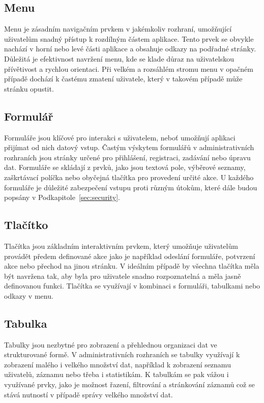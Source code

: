 \subsection*{Menu}
\label{subsec:admin-tags-menu}
Menu je zásadním navigačním prvkem v jakémkoliv rozhraní, umožňující uživatelům snadný přístup k rozdílným částem aplikace. Tento prvek se obvykle nachází v horní nebo levé části aplikace a obsahuje odkazy na podřadné stránky. Důležitá je efektivnost navržení menu, kde se klade důraz na uživatelskou přívětivost a rychlou orientaci. Při velkém a rozsáhlém stromu menu v opačném případě dochází k častému zmatení uživatele, který v takovém případě může stránku opustit.

\subsection*{Formulář}
\label{subsec:admin-tags-form}
Formuláře jsou klíčové pro interakci s uživatelem, neboť umožňují aplikaci přijímat od nich datový vstup. Častým výskytem formulářů v administrativních rozhraních jsou stránky určené pro přihlášení, registraci, zadávání nebo úpravu dat. Formuláře se skládají z prvků, jako jsou textová pole, výběrové seznamy, zaškrtávací políčka nebo obyčejná tlačítka pro provedení určité akce. U každého formuláře je důležité zabezpečení vstupu proti různým útokům, které dále budou popsány v Podkapitole~\ref{sec:security}.

\subsection*{Tlačítko}
\label{subsec:admin-tags-button}
Tlačítka jsou základním interaktivním prvkem, který umožňuje uživatelům provádět předem definované akce jako je například odeslání formuláře, potvrzení akce nebo přechod na jinou stránku. V ideálním případě by všechna tlačítka měla být navržena tak, aby byla pro uživatele snadno rozpoznatelná a měla jasně definovanou funkci. Tlačítka se využívají v kombinaci s formuláři, tabulkami nebo odkazy v menu.

\subsection*{Tabulka}
\label{subsec:admin-tags-table}
Tabulky jsou nezbytné pro zobrazení a přehlednou organizaci dat ve strukturované formě. V administrativních rozhraních se tabulky využívají k zobrazení malého i velkého množství dat, například k zobrazení seznamu uživatelů, záznamu nebo třeba i statistikám. K tabulkám se pak vážou i využívané prvky, jako je možnost řazení, filtrování a stránkování záznamů což se stává nutností v případě správy velkého množství dat.

